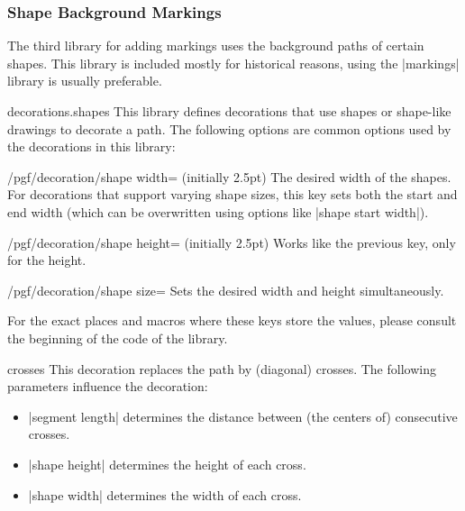 \subsubsection{Shape Background Markings}

The third library for adding markings uses the background paths of certain
shapes. This library is included mostly for historical reasons, using the
|markings| library is usually preferable.

\begin{pgflibrary}{decorations.shapes}
    This library defines decorations that use shapes or shape-like drawings to
    decorate a path. The following options are common options used by the
    decorations in this library:

    \begin{key}{/pgf/decoration/shape width=  (initially 2.5pt)}
        The desired width of the shapes. For decorations that support varying
        shape sizes, this key sets both the start and end width (which can be
        overwritten using options like |shape start width|).
    \end{key}

    \begin{key}{/pgf/decoration/shape height= (initially 2.5pt)}
        Works like the previous key, only for the height.
    \end{key}

    \begin{key}{/pgf/decoration/shape size=}
        Sets the desired width and height simultaneously.
    \end{key}

    For the exact places and macros where these keys store the values, please
    consult the beginning of the code of the library.
\end{pgflibrary}

\begin{decoration}{crosses}
    This decoration replaces the path by (diagonal) crosses. The following
    parameters influence the decoration:
    \begin{itemize}
        \item |segment length| determines the distance between (the centers of)
            consecutive crosses.
        \item |shape height| determines the height of each cross.
        \item |shape width| determines the width of each cross.
    \end{itemize}
\begin{codeexample}[preamble={\usetikzlibrary{decorations.shapes}}]
\end{codeexample}
\end{decoration}

